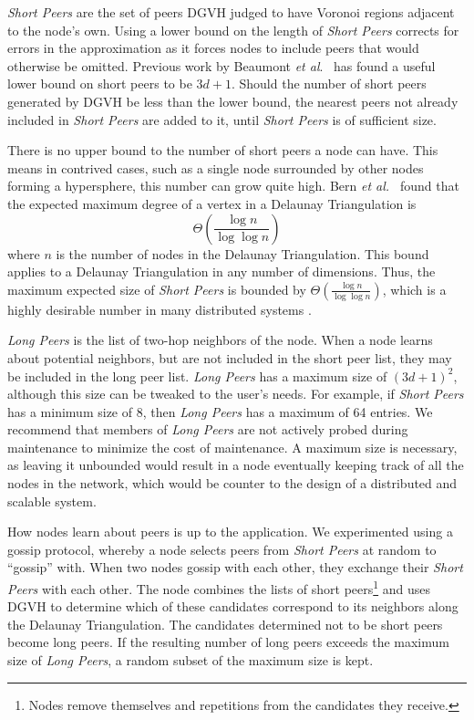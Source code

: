 \textit{Short Peers} are the set of peers DGVH judged to have Voronoi regions adjacent to the node's own. 
Using a lower bound on the length of \textit{Short Peers} corrects for errors in the approximation as it forces nodes to include peers that would otherwise be omitted. 
Previous work by Beaumont \textit{et al}.\ \cite{raynet} has found a useful lower bound on short peers to be $3d + 1$.
Should the number of short peers generated by DGVH be less than the lower bound, the nearest peers not already included in \textit{Short Peers} are added to it, until \textit{Short Peers} is of sufficient size.



There is no upper bound to the number of short peers a node can have.
This means in contrived cases, such as a single node surrounded by other nodes forming a hypersphere, this number can grow quite high.
Bern \textit{et al.\ }\cite{bern1991expected} found that the expected maximum degree of a vertex in a Delaunay Triangulation is
$$\Theta(\frac{\log n}{\log \log n} )$$ 
where $n$ is the number of nodes in the Delaunay Triangulation. 
This bound applies to a Delaunay Triangulation in any number of dimensions.
Thus, the maximum expected size of \textit{Short Peers} is bounded by $\Theta(\frac{\log n}{\log \log n} )$, which is a highly desirable number in many distributed systems \cite{chord} \cite{kademlia}.



\textit{Long Peers} is the list of two-hop neighbors of the node.
When a node learns about potential neighbors, but are not included in the short peer list, they may be included in the long peer list.  
\textit{Long Peers} has a maximum size of $(3d+1)^2$, although this size can be tweaked to the user's needs.  
For example, if \textit{Short Peers} has a minimum size of 8, then \textit{Long Peers} has a maximum of 64 entries.  
We recommend that members of \textit{Long Peers} are not actively probed during maintenance to minimize the cost of maintenance.
A maximum size is necessary, as leaving it unbounded would result in a node eventually keeping track of all the nodes in the network, which would be counter to the design of a distributed and scalable system.

How nodes learn about peers is up to the application.
We experimented using a gossip protocol, whereby a node selects peers from \textit{Short Peers} at random to ``gossip'' with.
When two nodes gossip with each other, they exchange their \textit{Short Peers} with each other.
The node combines the lists of short peers\footnote{Nodes remove themselves and repetitions from the candidates they receive.} and uses DGVH to determine which of these candidates correspond to its neighbors along the Delaunay Triangulation.
The candidates determined not to be short peers become long peers.  
If the resulting number of long peers exceeds the maximum size of \textit{Long Peers}, a random subset of the maximum size is kept.

